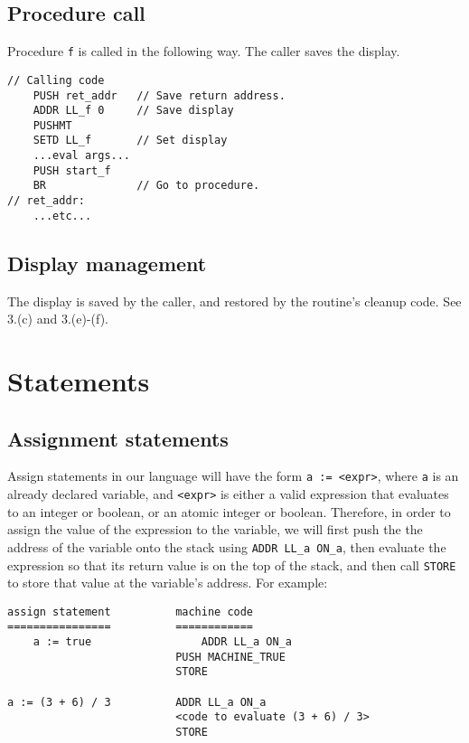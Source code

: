 \documentclass[11pt]{article}
\begin{document}
\subsection{Procedure call}

Procedure \texttt{f} is called in the following way.  The caller saves the
display.

\begin{verbatim}
// Calling code
    PUSH ret_addr   // Save return address.
    ADDR LL_f 0     // Save display
    PUSHMT
    SETD LL_f       // Set display
    ...eval args...
    PUSH start_f
    BR              // Go to procedure.
// ret_addr:
    ...etc...
\end{verbatim}

\subsection{Display management}

The display is saved by the caller, and restored by the routine's cleanup code.
See 3.(c) and 3.(e)-(f).

\section{Statements}

\subsection{Assignment statements}

Assign statements in our language will have the form \texttt{a := <expr>}, where \texttt{a} is an already declared variable, and \texttt{<expr>} is either a valid expression that evaluates to an integer or boolean, or an atomic integer or boolean. Therefore, in order to assign the value of the expression to the variable, we will first push the the address of the variable onto the stack using \texttt{ADDR LL\_a ON\_a}, then evaluate the expression so that its return value is on the top of the stack, and then call \texttt{STORE} to store that value at the variable's address. For example:

\begin{verbatim}
assign statement          machine code
================          ============
    a := true                 ADDR LL_a ON_a
                          PUSH MACHINE_TRUE
                          STORE

a := (3 + 6) / 3          ADDR LL_a ON_a
                          <code to evaluate (3 + 6) / 3>
                          STORE
\end{verbatim}
\end{document}
